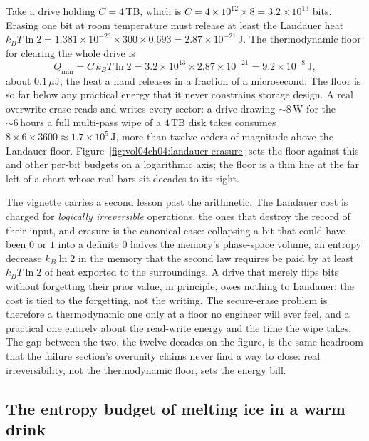 Take a drive holding $C = 4\,\text{TB}$, which is $C = 4\times10^{12}\times 8 =
3.2\times10^{13}$ bits. Erasing one bit at room temperature must release at least
the Landauer heat $k_B T \ln 2 = 1.381\times10^{-23}\times 300\times 0.693 =
2.87\times10^{-21}\,\text{J}$. The thermodynamic floor for clearing the whole
drive is
\[
Q_{\min} = C\,k_B T \ln 2
= 3.2\times10^{13}\times 2.87\times10^{-21}
= 9.2\times10^{-8}\,\text{J},
\]
about $0.1\,\mu\text{J}$, the heat a hand releases in a fraction of a microsecond.
The floor is so far below any practical energy that it never constrains storage
design. A real overwrite erase reads and writes every sector: a drive drawing
$\sim 8\,\text{W}$ for the $\sim 6\,\text{hours}$ a full multi-pass wipe of a
$4\,\text{TB}$ disk takes consumes $8\times 6\times 3600 \approx
1.7\times10^{5}\,\text{J}$, more than twelve orders of magnitude above the
Landauer floor. Figure~\ref{fig:vol04ch04:landauer-erasure} sets the floor against
this and other per-bit budgets on a logarithmic axis; the floor is a thin line at
the far left of a chart whose real bars sit decades to its right.

The vignette carries a second lesson past the arithmetic. The Landauer cost is
charged for \emph{logically irreversible} operations, the ones that destroy the
record of their input, and erasure is the canonical case: collapsing a bit that
could have been $0$ or $1$ into a definite $0$ halves the memory's phase-space
volume, an entropy decrease $k_B \ln 2$ in the memory that the second law requires
be paid by at least $k_B T \ln 2$ of heat exported to the surroundings. A drive
that merely flips bits without forgetting their prior value, in principle, owes
nothing to Landauer; the cost is tied to the forgetting, not the writing. The
secure-erase problem is therefore a thermodynamic one only at a floor no engineer
will ever feel, and a practical one entirely about the read-write energy and the
time the wipe takes. The gap between the two, the twelve decades on the figure, is
the same headroom that the failure section's overunity claims never find a way to
close: real irreversibility, not the thermodynamic floor, sets the energy bill.



\subsection{The entropy budget of melting ice in a warm drink}

